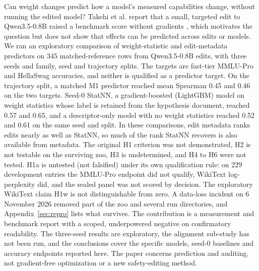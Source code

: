 Can weight changes predict how a model's measured capabilities change, without running the edited model? Takehi et al. report that a small, targeted edit to Qwen3.5-0.8B raised a benchmark score without gradients \citep{takehi2026wsp}, which motivates the question but does not show that effects can be predicted across edits or models. We ran an exploratory comparison of weight-statistic and edit-metadata predictors on 345 matched-reference rows from Qwen3.5-0.8B edits, with three seeds and family, seed and trajectory splits. The targets are fast-tier MMLU-Pro and HellaSwag accuracies, and neither is qualified as a predictor target. On the trajectory split, a matched M1 predictor reached mean Spearman 0.45 and 0.46 on the two targets. Seed-0 StatNN, a gradient-boosted (LightGBM) model on weight statistics whose label is retained from the hypothesis document, reached 0.57 and 0.65, and a descriptor-only model with no weight statistics reached 0.52 and 0.61 on the same seed and split. In these comparisons, edit metadata ranks edits nearly as well as StatNN, so much of the rank StatNN recovers is also available from metadata. The original H1 criterion was not demonstrated, H2 is not testable on the surviving zoo, H3 is undetermined, and H4 to H6 were not tested. H1a is untested (not falsified) under its own qualification rule: on 229 development entries the MMLU-Pro endpoint did not qualify, WikiText log-perplexity did, and the sealed panel was not scored by decision. The exploratory WikiText claim H1w is not distinguishable from zero. %
A data-loss incident on 6 November 2026 removed part of the zoo and several run directories, and Appendix~\ref{sec:repro} lists what survives.
The contribution is a measurement and benchmark report with a scoped, underpowered negative on confirmatory readability. The three-seed results are exploratory, the alignment sub-study has not been run, and the conclusions cover the specific models, seed-0 baselines and accuracy endpoints reported here. The paper concerns prediction and auditing, not gradient-free optimization or a new safety-editing method.
